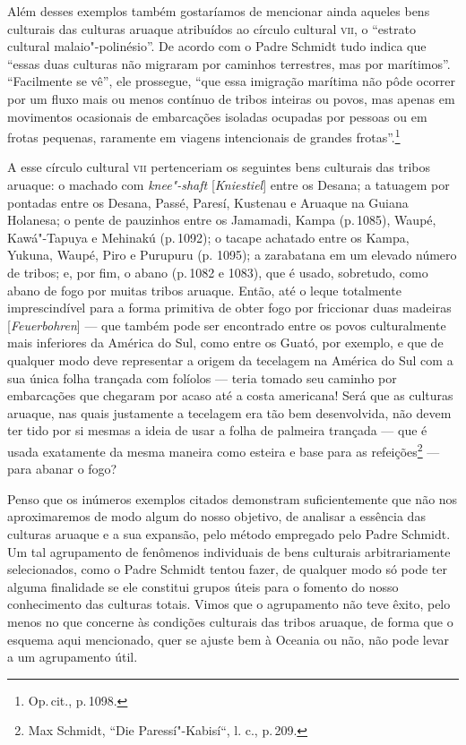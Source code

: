 Além desses exemplos também gostaríamos de mencionar ainda aqueles bens
culturais das culturas aruaque atribuídos ao círculo cultural \textsc{vii}, o
``estrato cultural malaio"-polinésio''. De acordo com o Padre Schmidt
tudo indica que ``essas duas culturas não migraram por caminhos
terrestres, mas por marítimos''. ``Facilmente se vê'', ele prossegue,
``que essa imigração marítima não pôde ocorrer por um fluxo mais ou
menos contínuo de tribos inteiras ou povos, mas apenas em movimentos
ocasionais de embarcações isoladas ocupadas por pessoas ou em frotas
pequenas, raramente em viagens intencionais de grandes
frotas''.\footnote{Op.\,cit., p.\,1098.}

A esse círculo cultural \textsc{vii} pertenceriam os seguintes bens culturais das
tribos aruaque: o machado com \textit{knee"-shaft} {[}\textit{Kniestiel}{]}
entre os Desana; a tatuagem por pontadas entre os Desana, Passé, Paresí,
Kustenau e Aruaque na Guiana Holanesa; o pente de pauzinhos entre os
Jamamadi, Kampa (p.\,1085), Waupé, Kawá"-Tapuya e Mehinakú (p.\,1092); o
tacape achatado entre os Kampa, Yukuna, Waupé, Piro e Purupuru (p.
1095); a zarabatana em um elevado número de tribos; e, por fim, o abano
(p.\,1082 e 1083), que é usado, sobretudo, como abano de fogo por muitas
tribos aruaque. Então, até o leque totalmente imprescindível para a
forma primitiva de obter fogo por friccionar duas madeiras
{[}\textit{Feuerbohren}{]} --- que também pode ser encontrado entre os
povos culturalmente mais inferiores da América do Sul, como entre os
Guató, por exemplo, e que de qualquer modo deve representar a origem da
tecelagem na América do Sul com a sua única folha trançada com folíolos
--- teria tomado seu caminho por embarcações que chegaram por acaso até a
costa americana! Será que as culturas aruaque, nas quais justamente a
tecelagem era tão bem desenvolvida, não devem ter tido por si mesmas a
ideia de usar a folha de palmeira trançada --- que é usada exatamente da
mesma maneira como esteira e base para as refeições\footnote{Max
  Schmidt, ``Die Paressí"-Kabisí``, l. c., p.\,209.} --- para abanar o
fogo?

Penso que os inúmeros exemplos citados demonstram suficientemente que
não nos aproximaremos de modo algum do nosso objetivo, de analisar a
essência das culturas aruaque e a sua expansão, pelo método empregado
pelo Padre Schmidt. Um tal agrupamento de fenômenos individuais de bens
culturais arbitrariamente selecionados, como o Padre Schmidt tentou
fazer, de qualquer modo só pode ter alguma finalidade se ele constitui
grupos úteis para o fomento do nosso conhecimento das culturas totais.
Vimos que o agrupamento não teve êxito, pelo menos no que concerne às
condições culturais das tribos aruaque, de forma que o esquema aqui
mencionado, quer se ajuste bem à Oceania ou não, não pode levar a um
agrupamento útil.

